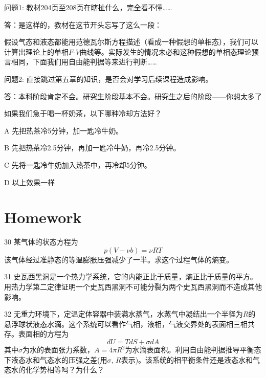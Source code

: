 \documentclass[CJK]{beamer}
\begin{document}
\begin{frame}
  \bch
  问题1: 教材204页至208页在瞎扯什么，完全看不懂……

  \skiplines
  
  答：是这样的，教材在这节开头忘写了这么一段：

  {\small 假设气态和液态都能用范德瓦尔斯方程描述（看成一种假想的单相态），我们可以计算出理论上的单相$F$-$V$曲线等。实际发生的情况未必和这种假想的单相态理论预言相同，下面我们用自由能判据等来进行判断……}

  \ech
\end{frame}


\begin{frame}
  \bch
  问题2: 直接跳过第五章的知识，是否会对学习后续课程造成影响。

  \skiplines
  
  答：本科阶段肯定不会。研究生阶段基本不会。研究生之后的阶段——你想太多了\bye

  \ech
\end{frame}


\begin{frame}
  \bch
  如果我们急于喝一杯奶茶，以下哪种冷却方法好？
  \bitem
\item[A]{先把热茶冷5分钟，加一匙冷牛奶。}
\item[B]{先把热茶冷2.5分钟，再加一匙冷牛奶，再冷2.5分钟。}
\item[C]{先将一匙冷牛奶加入热茶中，再冷却5分钟。}
\item[D]{以上效果一样}
  \eitem
  \ech
\end{frame}



\section{Homework}

\begin{frame}
\bch
{\small
\bitem
\item[30]{某气体的状态方程为
$$p(V- \nu b) = \nu RT$$
该气体经过准静态的等温膨胀压强减少了一半。求这个过程气体的熵变。}
\item[31]{史瓦西黑洞是一个热力学系统，它的内能正比于质量，熵正比于质量的平方。用热力学第二定律证明一个史瓦西黑洞不可能分裂为两个史瓦西黑洞而不造成其他影响。}
\item[32]{无重力环境下，定温定体容器中装满水蒸气，水蒸气中凝结出一个半径为$R$的悬浮球状液态水滴。这个系统可以看作气相，液相，气液交界处的表面相三相共存。表面相的方程为
  $$ dU = TdS + \sigma dA $$
  其中$\sigma$为水的表面张力系数，$A = 4\pi R^2$为水滴表面积。利用自由能判据推导平衡态下液态水和气态水的压强之差(用$\sigma$, $R$表示)。该系统的相平衡条件还是液态水和气态水的化学势相等吗？为什么？}
\eitem
}
\ech
\end{frame}
\end{document}
